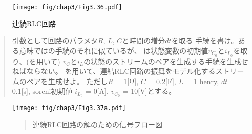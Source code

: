 \begin{figure}[tb]
\label{Figure 3.36}
\centering
\begin{comment}
\heading{Figure 3.36:} A series RLC circuit.

\begin{example}
              + v_R -
        i_R
     +--->----'\/\/\,--------+
     |                       |  i_L
    \|/          R          \|/
  +  |  i_C                  |_   +
    -+-                       _)
v_C -+- C                     _)  v_L
     |                        _)
  -  |                       |    -
     +-----------------------+
\end{example}
\end{comment}
\texttt{[image: fig/chap3/Fig3.36.pdf]}
\par\bigskip
\noindent
{} 連続RLC回路
\end{figure}

\begin{quote}
引数として回路のパラメタ\( R \), \( L \), \( C \)と時間の増分\( dt \)を取る
手続を書け。ある意味ではの手続のそれに似ているが、
は状態変数の初期値\( v_{C_0} \)と\( i_{L_0} \)を取り、(を用いて)
\( v_C \)と\( i_L \)の状態のストリームのペアを生成する手続を生成せねばならない。
を用いて、連結RLC回路の振舞をモデル化するストリームのペアを生成せよ。
ただし\( R \) = 1[Ω], \( C \) = 0.2[F], \( L \) = 1 henry, \( dt \)
= 0.1[s], soreni初期値 \( i_{L_0} \) = 0[A], \( v_{C_0} \) = 10[V]とする。
\end{quote}

\begin{figure}[tb]
\label{Figure 3.37}
\centering
\begin{comment}
\heading{Figure 3.37:} A signal-flow diagram for the solution to a series RLC circuit.

\begin{example}
                 +-------------+
+----------------+  scale: l/L |<--+
|                +-------------+   |
|                                  |
|                +-------------+   |  v_C
|       dv_C +-->|   integral  +---*------>
|            |   +-------------+
|            |        ^
|            |        | v_(C_0)
|            |
|            |   +-------------+
|            +---+ scale: -l/C |<--+
|                +-------------+   |
|  |\__                            |
+->|   \_  di_L  +-------------+   |  i_L
   | add_>------>|   integral  +---*------>
+->| __/         +-------------+   |
|  |/                 ^            |
|                     | i_(L_0)    |
|                                  |
|                +-------------+   |
+----------------+ scale: -R/L |<--+
                 +-------------+
\end{example}
\end{comment}
\texttt{[image: fig/chap3/Fig3.37a.pdf]}
\begin{quote}
 連続RLC回路の解のための信号フロー図
\end{quote}
\end{figure}

